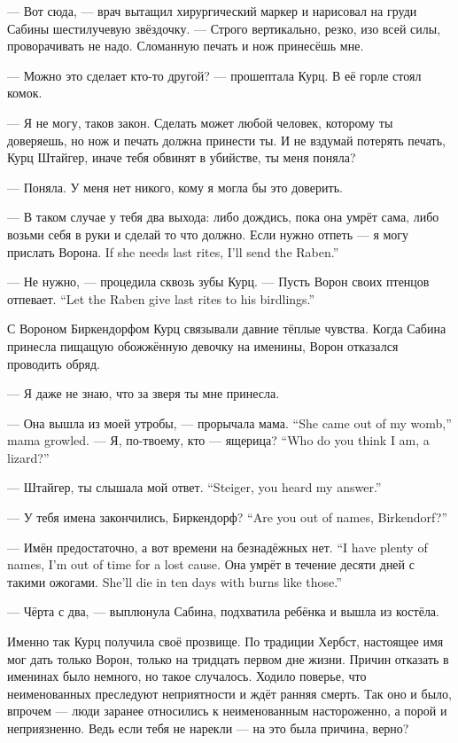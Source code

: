--- Вот сюда, --- врач вытащил хирургический маркер и нарисовал на груди Сабины шестилучевую звёздочку.
--- Строго вертикально, резко, изо всей силы, проворачивать не надо.
Сломанную печать и нож принесёшь мне.

--- Можно это сделает кто-то другой? --- прошептала Курц.
В её горле стоял комок.

--- Я не могу, таков закон.
Сделать может любой человек, которому ты доверяешь, но нож и печать должна принести ты.
И не вздумай потерять печать, Курц Штайгер, иначе тебя обвинят в убийстве, ты меня поняла?

--- Поняла.
У меня нет никого, кому я могла бы это доверить.

--- В таком случае у тебя два выхода: либо дождись, пока она умрёт сама, либо возьми себя в руки и сделай то что должно.
{Если нужно отпеть --- я могу прислать Ворона.}
{If she needs last rites, I'll send the Raben.''}

--- Не нужно, --- процедила сквозь зубы Курц.
{--- Пусть Ворон своих птенцов отпевает.}
{``Let the Raben give last rites to his birdlings.''}

С Вороном Биркендорфом Курц связывали давние тёплые чувства.
Когда Сабина принесла пищащую обожжённую девочку на именины, Ворон отказался проводить обряд.

--- Я даже не знаю, что за зверя ты мне принесла.

{--- Она вышла из моей утробы, --- прорычала мама.}
{``She came out of my womb,'' mama growled.}
{--- Я, по-твоему, кто --- ящерица?}
{``Who do you think I am, a lizard?''}

{--- Штайгер, ты слышала мой ответ.}
{``Steiger, you heard my answer.''}

{--- У тебя имена закончились, Биркендорф?}
{``Are you out of names, Birkendorf?''}

{--- Имён предостаточно, а вот времени на безнадёжных нет.}
{``I have plenty of names, I'm out of time for a lost cause.}
{Она умрёт в течение десяти дней с такими ожогами.}
{She'll die in ten days with burns like those.''}

--- Чёрта с два, --- выплюнула Сабина, подхватила ребёнка и вышла из костёла.

Именно так Курц получила своё прозвище.
По традиции Хербст, настоящее имя мог дать только Ворон, только на тридцать первом дне жизни.
Причин отказать в именинах было немного, но такое случалось.
Ходило поверье, что неименованных преследуют неприятности и ждёт ранняя смерть.
Так оно и было, впрочем --- люди заранее относились к неименованным настороженно, а порой и неприязненно.
Ведь если тебя не нарекли --- на это была причина, верно?

